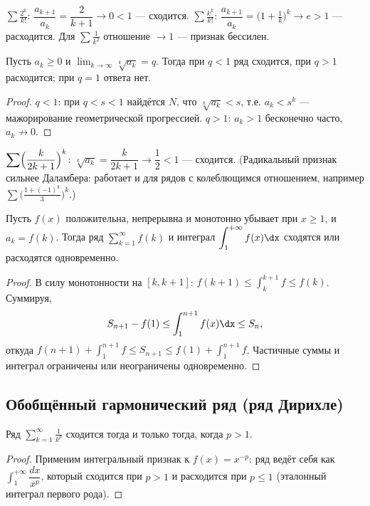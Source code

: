 \begin{example}
$\displaystyle\sum\frac{2^k}{k!}$: $\dfrac{a_{k+1}}{a_k}=\dfrac{2}{k+1}\to0<1$ — сходится.
$\displaystyle\sum\frac{k^k}{k!}$: $\dfrac{a_{k+1}}{a_k}=\bigl(1+\tfrac1k\bigr)^k\to e>1$ —
расходится. Для $\sum\frac1{k^2}$ отношение $\to1$ — признак бессилен.
\end{example}

\begin{theorem}
Пусть $a_k\ge0$ и $\displaystyle\lim_{k\to\infty}\sqrt[k]{a_k}=q$. Тогда при $q<1$ ряд сходится,
при $q>1$ расходится; при $q=1$ ответа нет.
\end{theorem}

\begin{proof}
$q<1$: при $q<s<1$ найдётся $N$, что $\sqrt[k]{a_k}<s$, т.е. $a_k<s^k$ — мажорирование
геометрической прогрессией. $q>1$: $a_k>1$ бесконечно часто, $a_k\not\to0$.
\end{proof}

\begin{example}
$\displaystyle\sum\Bigl(\frac{k}{2k+1}\Bigr)^k$: $\sqrt[k]{a_k}=\dfrac{k}{2k+1}\to\dfrac12<1$ —
сходится. (Радикальный признак сильнее Даламбера: работает и для рядов с колеблющимся
отношением, например $\sum\bigl(\tfrac{1+(-1)^k}{3}\bigr)^k$.)
\end{example}

\begin{theorem}
Пусть $f(x)$ положительна, непрерывна и монотонно убывает при $x\ge1$, и $a_k=f(k)$. Тогда ряд
$\displaystyle\sum_{k=1}^\infty f(k)$ и интеграл $\displaystyle\int_1^{+\infty}f(x)\dx$ сходятся
или расходятся одновременно.
\end{theorem}

\begin{proof}
В силу монотонности на $[k,k+1]$: $f(k+1)\le\int_k^{k+1}f\le f(k)$. Суммируя,
\[
  S_{n+1}-f(1)\le\int_1^{n+1}f(x)\dx\le S_n ,
\]
откуда $f(n+1)+\int_1^{n+1}f\le S_{n+1}\le f(1)+\int_1^{n+1}f$. Частичные суммы и интеграл
ограничены или неограничены одновременно.
\end{proof}

\subsection{Обобщённый гармонический ряд (ряд Дирихле)}

\begin{theorem}
Ряд $\displaystyle\sum_{k=1}^\infty\frac1{k^p}$ сходится тогда и только тогда, когда $p>1$.
\end{theorem}

\begin{proof}
Применим интегральный признак к $f(x)=x^{-p}$: ряд ведёт себя как
$\int_1^{+\infty}\dfrac{dx}{x^p}$, который сходится при $p>1$ и расходится при $p\le1$ (эталонный
интеграл первого рода).
\end{proof}
